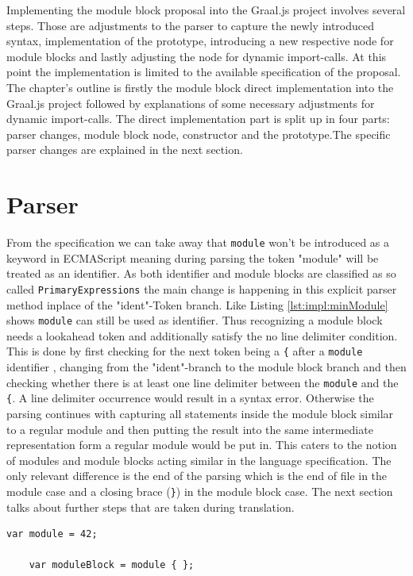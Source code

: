 Implementing the module block proposal into the Graal.js project involves several steps. Those are adjustments to the parser to capture the newly introduced syntax, implementation of the prototype, introducing a new respective node for module blocks and lastly adjusting the node for dynamic import-calls. At this point the implementation is limited to the available specification of the proposal. The chapter's outline is firstly the module block direct implementation into the Graal.js project followed by explanations of some necessary adjustments for dynamic import-calls. The direct implementation part is split up in four parts: parser changes, module block node, constructor and the prototype.The specific parser changes are explained in the next section.

\section{Parser}
From the specification we can take away that \texttt{module} won't be introduced as a keyword in ECMAScript meaning during parsing the token "module" will be treated as an identifier. As both identifier and module blocks are classified as so called \texttt{PrimaryExpressions} the main change is happening in this explicit parser method inplace of the "ident"-Token branch. Like Listing \ref{lst:impl:minModule} shows \texttt{module} can still be used as identifier. Thus recognizing a module block needs a lookahead token and additionally satisfy the no line delimiter condition. This is done by first checking for the next token being a \texttt{\{} after a \texttt{module} identifier , changing from the "ident"-branch to the module block branch and then checking whether there is at least one line delimiter between the \texttt{module} and the \texttt{\{}. A line delimiter occurrence would result in a syntax error. Otherwise the parsing continues with capturing all statements inside the module block similar to a regular module and then putting the result into the same intermediate representation form a regular module would be put in. This caters to the notion of modules and module blocks acting similar in the language specification. The only relevant difference is the end of the parsing which is the end of file in the module case and a closing brace (\texttt{\}}) in the module block case. The next section talks about further steps that are taken during translation.

\begin{lstlisting}[caption={Minimal module identifier example in JavaScript}, label={lst:impl:minModule}]
    var module = 42;
    
    var moduleBlock = module { };
\end{lstlisting}

